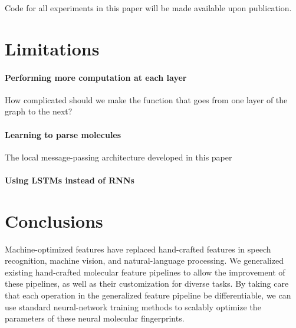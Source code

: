 \documentclass{article}
\begin{document}
Code for all experiments in this paper will be made available upon publication.

\section{Limitations}
\paragraph{Performing more computation at each layer}
How complicated should we make the function that goes from one layer of the graph to the next?
\paragraph{Learning to parse molecules}
The local message-passing architecture developed in this paper




\paragraph{Using LSTMs instead of RNNs}


\section{Conclusions}
Machine-optimized features have replaced hand-crafted features in speech recognition, machine vision, and natural-language processing.
We generalized existing hand-crafted molecular feature pipelines to allow the improvement of these pipelines, as well as their customization for diverse tasks.
By taking care that each operation in the generalized feature pipeline be differentiable, we can use standard neural-network training methods to scalably optimize the parameters of these neural molecular fingerprints.



\end{document}
